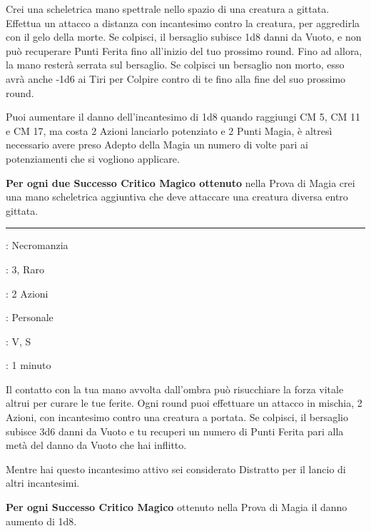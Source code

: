 \begin{multicols}{2}
Crei una scheletrica mano spettrale nello spazio di una creatura a gittata. Effettua un attacco a distanza con incantesimo contro la creatura, per aggredirla con il gelo della morte. Se colpisci, il bersaglio subisce 1d8 danni da Vuoto, e non può recuperare Punti Ferita fino all'inizio del tuo prossimo round. Fino ad allora, la mano resterà serrata sul bersaglio. Se colpisci un bersaglio non morto, esso avrà anche -1d6 ai Tiri per Colpire contro di te fino alla fine del suo prossimo round.

Puoi aumentare il danno dell'incantesimo di 1d8 quando raggiungi CM 5, CM 11 e CM 17, ma costa 2 Azioni lanciarlo potenziato e 2 Punti Magia, è altresì necessario avere preso Adepto della Magia un numero di volte pari ai potenziamenti che si vogliono applicare.

\textbf{Per ogni due Successo Critico Magico ottenuto} nella Prova di Magia crei una mano scheletrica aggiuntiva che deve attaccare una creatura diversa entro gittata.

\smallskip\noindent\rule{\linewidth}{2pt} \hypertarget{Tocco Vampirico}{}\smallskip{}
\noindent
\begin{description}[noitemsep, topsep=0pt, parsep=0pt, partopsep=0pt, leftmargin=0cm, labelwidth=2.8cm]
	\item[\textbf{Lista di Magia}]: Necromanzia
	\item[\textbf{Livello}]: 3, Raro
	\item[\textbf{T. di Lancio}]: 2 Azioni
	\item[\textbf{Gittata}]: Personale
	\item[\textbf{Componenti}]: V, S
	\item[\textbf{Durata}]: 1 minuto
\end{description}

Il contatto con la tua mano avvolta dall'ombra può risucchiare la forza vitale altrui per curare le tue ferite. Ogni round puoi effettuare un attacco in mischia, 2 Azioni, con incantesimo contro una creatura a portata. Se colpisci, il bersaglio subisce 3d6 danni da Vuoto e tu recuperi un numero di Punti Ferita pari alla metà del danno da Vuoto che hai inflitto.

Mentre hai questo incantesimo attivo sei considerato Distratto per il lancio di altri incantesimi.

\textbf{Per ogni Successo Critico Magico} ottenuto nella Prova di Magia il danno aumento di 1d8.


\end{multicols}
